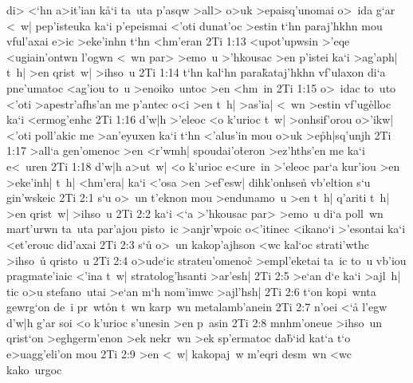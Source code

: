 di>
<`hn
a>it'ian
k\r{a}`i
ta~uta
p'asqw
>all>
o>uk
>epaisq'unomai
o>~ida
g`ar
<~w|
pep'isteuka
ka`i
p'epeismai
<'oti
dunat'oc
>estin
t`hn
paraj'hkhn
mou
vful'axai
e>ic
>eke'inhn
t`hn
<hm'eran\bibvsend
\vs 2Ti 1:13
<upot'upwsin
>'eqe
<ugiain'ontwn
l'ogwn
<~wn
par>
>emo~u
>'hkousac
>en
p'istei
ka`i
>ag'aph|
t~h|
>en
qrist~w|
>ihso~u\bibvsend
\vs 2Ti 1:14
t`hn
kal`hn
para\r{k}ataj'hkhn
vf'ulaxon
di`a
pne'umatoc
<ag'iou
to~u
>enoiko~untoc
>en
<hm~in\bibvsend
\vs 2Ti 1:15
o>~idac
to~uto
<'oti
>apestr'afhs'an
me
p'antec
o<i
>en
t~h|
>as'ia|
<~wn
>estin
vf'ug\r{e}lloc
ka`i
<ermog'enhc\bibvsend
\vs 2Ti 1:16
d'w|h
>'eleoc
<o
k'urioc
t~w|
>onhsif'orou
o>'ikw|
<'oti
poll'akic
me
>an'eyuxen
ka`i
t`hn
<'alus'in
mou
o>uk
>e\r{p}h|sq'unjh\bibvsend
{}
\vs 2Ti 1:17
>all`a
gen'omenoc
>en
<r'wmh|
spoudai'o\r{t}eron
>ez'hths'en
me
ka`i
e<~uren\bibvsend
\vs 2Ti 1:18
d'w|h
a>ut~w|
<o
k'urioc
e<ure~in
>'eleoc
par`a
kur'iou
>en
>eke'inh|
t~h|
<hm'era|
ka`i
<'osa
>en
>ef'esw|
dihk'onhse\r{n}
vb'eltion
s`u
gin'wskeic\bibvsend
\vs 2Ti 2:1
s`u
o>~un
t'eknon
mou
>endunamo~u
>en
t~h|
q'ariti
t~h|
>en
qrist~w|
>ihso~u\bibvsend
\vs 2Ti 2:2
ka`i
<`a
>'hkousac
par>
>emo~u
di`a
poll~wn
mart'urwn
ta~uta
par'ajou
pisto~ic
>anjr'wpoic
o<'itinec
<ikano`i
>'esontai
ka`i
<et'erouc
did'axai\bibvsend
\vs 2Ti 2:3
s`u\r{}
o>~un
kakop'ajhson
<wc
kal`oc
strati'wthc
>ihso~u\r{}
qristo~u\bibvsend
\vs 2Ti 2:4
o>ude`ic
strateu'omeno\r{c}
>empl'eketai
ta~ic
to~u
vb'iou
pragmate'iaic
<'ina
t~w|
stratolog'hsanti
>ar'esh|\bibvsend
\vs 2Ti 2:5
>e`an
d`e
ka`i
>ajl~h|
tic
o>u
stefano~utai
>e`an
m`h
nom'imwc
>ajl'hsh|\bibvsend
\vs 2Ti 2:6
t`on
kopi~wnta
gewrg`on
de~i
pr~wt\r{o}n
t~wn
karp~wn
metalamb'anein\bibvsend
\vs 2Ti 2:7
n'oei
<`a\r{}
l'egw
d'w|h
g'ar
soi
<o
k'urioc
s'unesin
>en
p~asin\bibvsend
\vs 2Ti 2:8
mnhm'oneue
>ihso~un
qrist`on
>eghgerm'enon
>ek
nekr~wn
>ek
sp'ermatoc
da\r{b}`id
kat`a
t`o
e>uagg'eli'on
mou\bibvsend
\vs 2Ti 2:9
>en
<~w|
kakopaj~w
m'eqri
desm~wn
<wc
kako~urgoc

